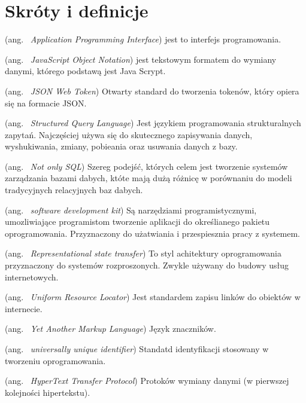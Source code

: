 \chapter*{Skróty i definicje}\mbox{}
\label{sec:skroty}
\noindent
\begin{description}[labelwidth=*]
  \item [API] (ang. \ \emph{Application Programming Interface}) jest to interfejs programowania.
  \item [JSON] (ang. \ \emph{JavaScript Object Notation}) jest tekstowym formatem do wymiany danymi, którego podstawą jest Java Scrypt.
  \item [JWT] (ang. \ \emph{JSON Web Token}) Otwarty standard do tworzenia tokenów, który opiera się na formacie JSON.
  \item [SQL] (ang. \ \emph{Structured Query Language}) Jest językiem programowania strukturalnych zapytań. Najczęściej używa się do skutecznego zapisywania danych, wyshukiwania, zmiany, pobieania oraz usuwania danych z bazy. 
  \item [NoSQL] (ang. \ \emph{Not only SQL}) Szereg podejść, których celem jest tworzenie systemów zarządzania bazami dabych, któte mają dużą różnicę w porównaniu do modeli tradycyjnych relacyjnych baz dabych.
  \item [SDK] (ang. \ \emph{software development kit}) Są narzędziami programistycznymi, umozliwiające programistom tworzenie aplikacji do określianego pakietu oprogramowania. Przyznaczony do użatwiania i przespiesznia pracy z systemem.
  \item [Rest] (ang. \ \emph{Representational state transfer}) To styl achitektury oprogramowania przyznaczony do systemów rozproszonych. Zwykle używany do budowy usług internetowych.
  \item [URL] (ang. \ \emph{Uniform Resource Locator}) Jest standardem zapisu linków do obiektów w internecie.
  \item [YAML] (ang. \ \emph{Yet Another Markup Language}) Język znaczników.
  \item [UUID] (ang. \ \emph{universally unique identifier}) Standatd identyfikacji stosowany w tworzeniu oprogramowania.
  \item [HTTP] (ang. \ \emph{HyperText Transfer Protocol}) Protoków wymiany danymi (w pierwszej kolejności hipertekstu).
\end{description}
